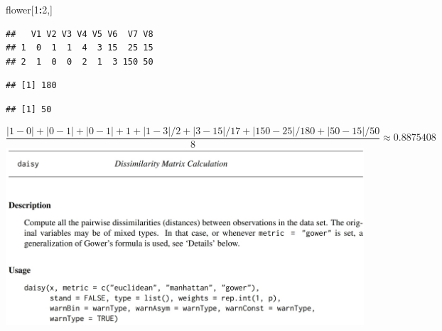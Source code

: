 \documentclass[
]{article}
\newenvironment{Shaded}{\begin{snugshade}}{\end{snugshade}}
\newcommand{\DecValTok}[1]{\textcolor[rgb]{0.00,0.00,0.81}{#1}}
\newcommand{\KeywordTok}[1]{\textcolor[rgb]{0.13,0.29,0.53}{\textbf{#1}}}
\newcommand{\NormalTok}[1]{#1}
\newcommand{\OperatorTok}[1]{\textcolor[rgb]{0.81,0.36,0.00}{\textbf{#1}}}
\begin{document}
\begin{Shaded}
\begin{Highlighting}[]
\NormalTok{flower[}\DecValTok{1}\OperatorTok{:}\DecValTok{2}\NormalTok{,]}
\end{Highlighting}
\end{Shaded}

\begin{verbatim}
##   V1 V2 V3 V4 V5 V6  V7 V8
## 1  0  1  1  4  3 15  25 15
## 2  1  0  0  2  1  3 150 50
\end{verbatim}

\begin{Shaded}
\end{Shaded}

\begin{verbatim}
## [1] 180
\end{verbatim}

\begin{Shaded}
\end{Shaded}

\begin{verbatim}
## [1] 50
\end{verbatim}

\[\frac{|1-0|+|0-1|+|0-1|+1+|1-3|/2+|3-15|/17+|150-25|/180+|50-15|/50}{8}\approx 0.8875408\]
\includegraphics{Daisy.jpg}
\end{document}
